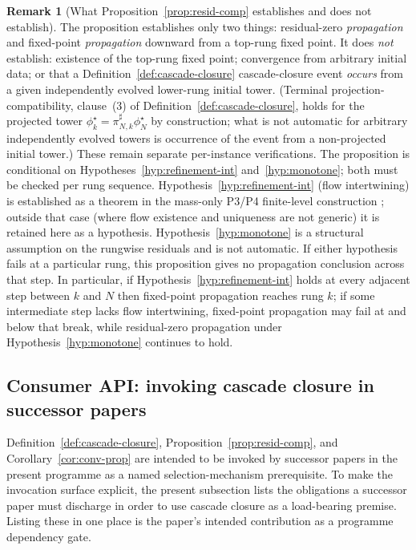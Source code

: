 \documentclass[11pt]{article}
\theoremstyle{definition}
\newtheorem{remark}[theorem]{Remark}
\begin{document}
\begin{remark}[What Proposition~\ref{prop:resid-comp} establishes and does not establish]\label{rem:resid-comp-status}
The proposition establishes only two things: residual-zero
\emph{propagation} and fixed-point \emph{propagation} downward from a
top-rung fixed point. It does \emph{not} establish: existence of the
top-rung fixed point; convergence from arbitrary initial data; or
that a Definition~\ref{def:cascade-closure} cascade-closure event
\emph{occurs} from a given independently evolved lower-rung initial
tower. (Terminal projection-compatibility, clause~(3) of
Definition~\ref{def:cascade-closure}, holds for the projected tower
$\phi^\star_k = \pi^{\sharp}_{N, k} \phi^\star_N$ by construction;
what is not automatic for arbitrary independently evolved towers is
occurrence of the event from a non-projected initial tower.) These
remain separate per-instance verifications. The proposition is
conditional on Hypotheses~\ref{hyp:refinement-int}
and~\ref{hyp:monotone}; both must be checked per rung sequence. Hypothesis~\ref{hyp:refinement-int}
(flow intertwining) is established as a theorem in the mass-only P3/P4
finite-level construction
\cite{CascadeRefinementSpaces, CascadeClosureDynamics}; outside that
case (where flow existence and uniqueness are not generic) it is
retained here as a hypothesis. Hypothesis~\ref{hyp:monotone}
is a structural assumption on the rungwise residuals and is not
automatic. If either hypothesis fails at a particular rung, this
proposition gives no propagation conclusion across that step. In
particular, if Hypothesis~\ref{hyp:refinement-int} holds at every
adjacent step between $k$ and $N$ then fixed-point propagation
reaches rung $k$; if some intermediate step lacks flow intertwining,
fixed-point propagation may fail at and below that break, while
residual-zero propagation under Hypothesis~\ref{hyp:monotone}
continues to hold.
\end{remark}

\subsection{Consumer API: invoking cascade closure in successor papers}\label{ssec:consumer-api}

Definition~\ref{def:cascade-closure}, Proposition~\ref{prop:resid-comp},
and Corollary~\ref{cor:conv-prop} are intended to be invoked by
successor papers in the present programme as a named selection-mechanism
prerequisite. To make the invocation surface explicit, the present
subsection lists the obligations a successor paper must discharge in
order to use cascade closure as a load-bearing premise. Listing these
in one place is the paper's intended contribution as a programme
dependency gate.
\end{document}
